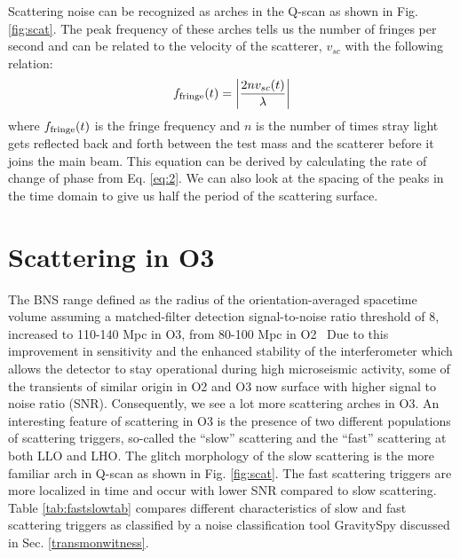 \documentclass[12pt]{iopart}
\begin{document}
Scattering noise can be recognized as arches in the Q-scan  as shown in Fig. \ref{fig:scat}. The peak frequency of these arches tells us the number of fringes per second and can be related to the velocity of the scatterer, $v_{sc}$ with the following relation:
\begin{equation}
    f_{\rm fringe}(t) = \left|\frac{2nv_{sc}(t)}{\lambda}\right|  \label{eq:3}
\end{equation}
where $f_{\rm fringe}(t)$ is the fringe frequency and $n$ is the number of times stray light gets reflected back and forth between the test mass and the scatterer before it joins the main beam. This equation can be derived by calculating the rate of change of phase from Eq. \ref{eq:2}.  We can also look at the spacing of the peaks in the time domain to give us half the period of the scattering surface. 






\section{Scattering in O3}\label{scatino3}
The BNS range defined as the radius of the orientation-averaged spacetime volume assuming a
matched-filter detection signal-to-noise ratio threshold of 8, increased to 110-140 Mpc in O3, from 80-100 Mpc in O2~\cite{prospect} Due to this improvement in sensitivity and the enhanced stability of the interferometer which allows the detector to stay operational during high microseismic activity, some of the transients of similar origin in O2 and O3 now surface with higher signal to noise ratio (SNR). 
Consequently, we see a lot more scattering arches in O3. An interesting feature of scattering in O3 is the presence of two different populations of scattering triggers, so-called the ``slow'' scattering and the ``fast'' scattering at both LLO and LHO. The glitch morphology of the slow scattering is the more familiar arch in Q-scan as shown in Fig. \ref{fig:scat}. The fast scattering triggers are more localized in time and occur with lower SNR compared to slow scattering. Table \ref{tab:fastslowtab} compares different characteristics of slow and fast scattering triggers as classified by a noise classification tool GravitySpy discussed in Sec. \ref{transmonwitness}.
\end{document}
